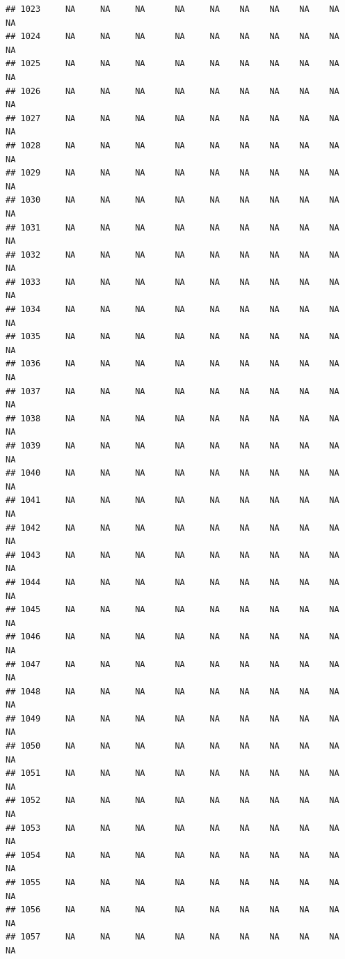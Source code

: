 \documentclass{article}\usepackage{graphicx, color}
\makeatletter
\newenvironment{kframe}{%
 \def\at@end@of@kframe{}%
 \ifinner\ifhmode%
  \def\at@end@of@kframe{\end{minipage}}%
  \begin{minipage}{\columnwidth}%
 \fi\fi%
 \def\FrameCommand##1{\hskip\@totalleftmargin \hskip-\fboxsep
 \colorbox{shadecolor}{##1}\hskip-\fboxsep
     \hskip-\linewidth \hskip-\@totalleftmargin \hskip\columnwidth}%
 \MakeFramed {\advance\hsize-\width
   \@totalleftmargin\z@ \linewidth\hsize
   \@setminipage}}%
 {\par\unskip\endMakeFramed%
 \at@end@of@kframe}
\newenvironment{knitrout}{}{} %
\makeatother
\begin{document}
\begin{knitrout}
\begin{kframe}
\begin{verbatim}
## 1023     NA     NA     NA      NA     NA    NA    NA    NA    NA     NA
## 1024     NA     NA     NA      NA     NA    NA    NA    NA    NA     NA
## 1025     NA     NA     NA      NA     NA    NA    NA    NA    NA     NA
## 1026     NA     NA     NA      NA     NA    NA    NA    NA    NA     NA
## 1027     NA     NA     NA      NA     NA    NA    NA    NA    NA     NA
## 1028     NA     NA     NA      NA     NA    NA    NA    NA    NA     NA
## 1029     NA     NA     NA      NA     NA    NA    NA    NA    NA     NA
## 1030     NA     NA     NA      NA     NA    NA    NA    NA    NA     NA
## 1031     NA     NA     NA      NA     NA    NA    NA    NA    NA     NA
## 1032     NA     NA     NA      NA     NA    NA    NA    NA    NA     NA
## 1033     NA     NA     NA      NA     NA    NA    NA    NA    NA     NA
## 1034     NA     NA     NA      NA     NA    NA    NA    NA    NA     NA
## 1035     NA     NA     NA      NA     NA    NA    NA    NA    NA     NA
## 1036     NA     NA     NA      NA     NA    NA    NA    NA    NA     NA
## 1037     NA     NA     NA      NA     NA    NA    NA    NA    NA     NA
## 1038     NA     NA     NA      NA     NA    NA    NA    NA    NA     NA
## 1039     NA     NA     NA      NA     NA    NA    NA    NA    NA     NA
## 1040     NA     NA     NA      NA     NA    NA    NA    NA    NA     NA
## 1041     NA     NA     NA      NA     NA    NA    NA    NA    NA     NA
## 1042     NA     NA     NA      NA     NA    NA    NA    NA    NA     NA
## 1043     NA     NA     NA      NA     NA    NA    NA    NA    NA     NA
## 1044     NA     NA     NA      NA     NA    NA    NA    NA    NA     NA
## 1045     NA     NA     NA      NA     NA    NA    NA    NA    NA     NA
## 1046     NA     NA     NA      NA     NA    NA    NA    NA    NA     NA
## 1047     NA     NA     NA      NA     NA    NA    NA    NA    NA     NA
## 1048     NA     NA     NA      NA     NA    NA    NA    NA    NA     NA
## 1049     NA     NA     NA      NA     NA    NA    NA    NA    NA     NA
## 1050     NA     NA     NA      NA     NA    NA    NA    NA    NA     NA
## 1051     NA     NA     NA      NA     NA    NA    NA    NA    NA     NA
## 1052     NA     NA     NA      NA     NA    NA    NA    NA    NA     NA
## 1053     NA     NA     NA      NA     NA    NA    NA    NA    NA     NA
## 1054     NA     NA     NA      NA     NA    NA    NA    NA    NA     NA
## 1055     NA     NA     NA      NA     NA    NA    NA    NA    NA     NA
## 1056     NA     NA     NA      NA     NA    NA    NA    NA    NA     NA
## 1057     NA     NA     NA      NA     NA    NA    NA    NA    NA     NA

\end{verbatim}
\end{kframe}
\end{knitrout}
\end{document}

